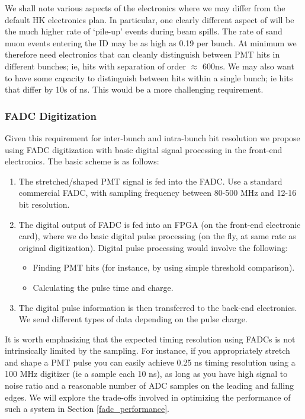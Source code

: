 We shall note various aspects of the \nuprism electronics where we may differ from
the default HK electronics plan.
In particular, one clearly different aspect of \nuprism will be the much higher rate of 
`pile-up' events during beam spills.  The rate of sand muon events entering the ID
may be as high as 0.19 per bunch.  
At minimum we therefore need electronics that can cleanly distinguish 
between PMT hits in different bunches; ie, hits with separation of order $\approx$ 600ns.  We may also 
want to have some capacity to distinguish between hits within a single bunch; ie hits that differ by 10s of ns.
This would be a more challenging requirement.


\subsubsection{FADC Digitization}\label{fadc_digitization}

Given this requirement for inter-bunch and intra-bunch hit resolution we propose using 
FADC digitization with basic digital signal processing in the front-end electronics.  
The basic scheme is as follows:  

\begin{enumerate}
\item The stretched/shaped PMT signal is fed into the FADC.
Use a standard commercial FADC, with sampling frequency between 80-500 MHz and 
12-16 bit resolution.
\item The digital output of FADC is fed into an FPGA (on the front-end electronic card), 
where we do basic digital pulse processing
(on the fly, at same rate as original digitization).  Digital pulse processing would involve the 
following:
\begin{itemize}
\item Finding PMT hits (for instance, by using simple threshold comparison).
\item Calculating the pulse time and charge.  
\end{itemize}
\item The digital pulse information is then transferred to the back-end electronics.  
We send different types of data depending on the pulse charge.

\end{enumerate}

It is worth emphasizing that the 
expected timing resolution using FADCs is not intrinsically limited by the sampling.  For instance, if you appropriately 
stretch and shape a PMT pulse you can easily achieve 0.25 ns timing resolution using a 100 MHz digitizer (ie a sample each 10 ns), as long
as you have high signal to noise ratio and a reasonable number of ADC samples on the leading and falling edges. 
We will explore the trade-offs involved in optimizing the performance of such a system in Section \ref{fadc_performance}.

